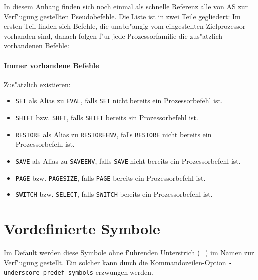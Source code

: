 \documentclass[12pt,a4paper,twoside]{report}
\newcommand{\tty}[1]{{\tt #1}}
\newcommand{\asname}{AS}
\begin{document}
In diesem Anhang finden sich noch einmal als schnelle Referenz alle
von \asname{} zur Verf"ugung gestellten Pseudobefehle.  Die Liste ist in zwei
Teile gegliedert: Im ersten Teil finden sich Befehle, die unabh"angig
vom eingestellten Zielprozessor vorhanden sind, danach folgen f"ur
jede Prozessorfamilie die zus"atzlich vorhandenen Befehle:

\subsubsection{Immer vorhandene Befehle}

Zus"atzlich existieren:
\begin{itemize}
\item{\tty{SET} als Alias zu \tty{EVAL}, falls \tty{SET} nicht bereits ein
      Prozessorbefehl ist.}
\item{\tty{SHIFT} bzw. \tty{SHFT}, falls \tty{SHIFT} bereits ein Prozessorbefehl
      ist.}
\item{\tty{RESTORE} als Alias zu \tty{RESTOREENV}, falls \tty{RESTORE} nicht bereits ein
      Prozessorbefehl ist.}
\item{\tty{SAVE} als Alias zu \tty{SAVEENV}, falls \tty{SAVE} nicht bereits ein
      Prozessorbefehl ist.}
\item{\tty{PAGE} bzw. \tty{PAGESIZE}, falls \tty{PAGE} bereits ein Prozessorbefehl
      ist.}
\item{\tty{SWITCH} bzw. \tty{SELECT}, falls \tty{SWITCH} bereits ein Prozessorbefehl
      ist.}
\end{itemize}

\newcommand{\pcsymname}{Symbol f"ur Programmz"ahler}



\cleardoublepage
\chapter{Vordefinierte Symbole}\label{AppInternSyms}

Im Default werden diese Symbole ohne f"uhrenden Unterstrich (\_) im Namen
zur Verf"ugung gestellt.  Ein solcher kann durch die Kommandozeilen-Option
\tty{-underscore-predef-symbols} erzwungen werden.
\end{document}
